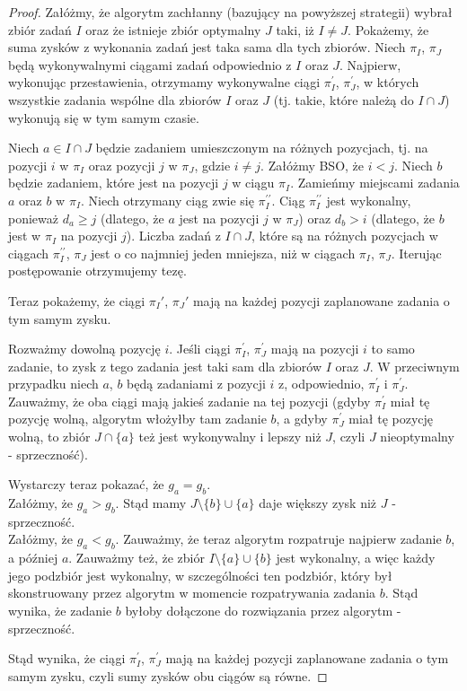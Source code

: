 \begin{proof}
Załóżmy, że algorytm zachłanny (bazujący na powyższej strategii) wybrał zbiór zadań $I$ oraz że istnieje zbiór optymalny $J$ taki, iż $I \neq J$.
Pokażemy, że suma zysków z wykonania zadań jest taka sama dla tych zbiorów.
Niech $\pi_I$, $\pi_J$ będą wykonywalnymi ciągami zadań odpowiednio z $I$ oraz $J$.
Najpierw, wykonując przestawienia, otrzymamy wykonywalne ciągi $\pi ^{\prime}_I$, $\pi^{\prime}_J$, w których wszystkie zadania wspólne dla zbiorów $I$ oraz $J$ (tj. takie, które należą do $I \cap J$) wykonują się w tym samym czasie.

Niech $a \in I \cap J$ będzie zadaniem umieszczonym na różnych pozycjach, tj. na pozycji $i$ w $\pi_I$ oraz pozycji $j$ w $\pi_J$, gdzie $i \neq j$.
Załóżmy BSO, że $i < j$.
Niech $b$ będzie zadaniem, które jest na pozycji $j$ w ciągu $\pi_I$.
Zamieńmy miejscami zadania $a$ oraz $b$ w $\pi_I$.
Niech otrzymany ciąg zwie się $\pi^{\prime\prime}_I$.
Ciąg $\pi^{\prime\prime}_I$ jest wykonalny, ponieważ $d_a \geq j$ (dlatego, że $a$ jest na pozycji $j$ w $\pi_J$) oraz $d_b > i$ (dlatego, że $b$ jest w $\pi_I$ na pozycji $j$).
Liczba zadań z $I \cap J$, które są na różnych pozycjach w ciągach $\pi^{\prime\prime}_I$, $\pi_J$ jest o co najmniej jeden mniejsza, niż w ciągach $\pi_I$, $\pi_J$.
Iterując postępowanie otrzymujemy tezę.

Teraz pokażemy, że ciągi $\pi_I \prime$, $\pi_J \prime$ mają na każdej pozycji zaplanowane zadania o tym samym zysku.

Rozważmy dowolną pozycję $i$. Jeśli ciągi $\pi^{\prime}_I$, $\pi^{\prime}_J$ mają na pozycji $i$ to samo zadanie, to zysk z tego zadania jest taki sam dla zbiorów $I$ oraz $J$.
W przeciwnym przypadku niech $a$, $b$ będą zadaniami z pozycji $i$ z, odpowiednio, $\pi^{\prime}_I$ i $\pi^{\prime}_J$.
Zauważmy, że oba ciągi mają jakieś zadanie na tej pozycji (gdyby $\pi^{\prime}_I$ miał tę pozycję wolną, algorytm włożyłby tam zadanie $b$, a gdyby $\pi^{\prime}_J$ miał tę pozycję wolną, to zbiór $J \cap \{a\}$ też jest wykonywalny i lepszy niż $J$, czyli $J$ nieoptymalny - sprzeczność).

Wystarczy teraz pokazać, że $g_a = g_b$. \\
Załóżmy, że $g_a > g_b$.
Stąd mamy $J \setminus \{b\} \cup \{a\}$ daje większy zysk niż $J$ - sprzeczność. \\
Załóżmy, że $g_a < g_b$.
Zauważmy, że teraz algorytm rozpatruje najpierw zadanie $b$, a później $a$.
Zauważmy też, że zbiór $I \setminus  \{a\} \cup  \{b\}$ jest wykonalny, a więc każdy jego podzbiór jest wykonalny, w szczególności ten podzbiór, który był skonstruowany przez algorytm w momencie rozpatrywania zadania $b$.
Stąd wynika, że zadanie $b$ byłoby dołączone do rozwiązania przez algorytm - sprzeczność.

Stąd wynika, że ciągi $\pi^{\prime}_I$, $\pi^{\prime}_J$ mają na każdej pozycji zaplanowane zadania o tym samym zysku, czyli sumy zysków obu ciągów są równe.
\end{proof}

